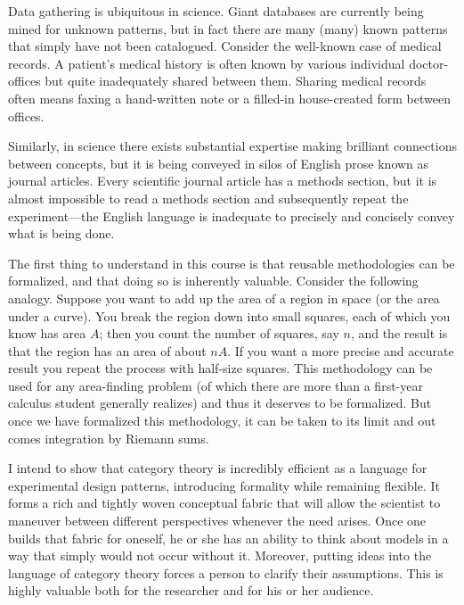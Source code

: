 \documentclass{book}
\theoremstyle{remark}
\theoremstyle{definition}
\begin{document}
Data gathering is ubiquitous in science. Giant databases are currently being mined for unknown patterns, but in fact there are many (many) known patterns that simply have not been catalogued. Consider the well-known case of medical records. A patient's medical history is often known by various individual doctor-offices but quite inadequately shared between them. Sharing medical records often means faxing a hand-written note or a filled-in house-created form between offices. 

Similarly, in science there exists substantial expertise making brilliant connections between concepts, but it is being conveyed in silos of English prose known as journal articles. Every scientific journal article has a methods section, but it is almost impossible to read a methods section and subsequently repeat the experiment---the English language is inadequate to precisely and concisely convey what is being done.

The first thing to understand in this course is that reusable methodologies can be formalized, and that doing so is inherently valuable. Consider the following analogy. Suppose you want to add up the area of a region in space (or the area under a curve). You break the region down into small squares, each of which you know has area $A$; then you count the number of squares, say $n$, and the result is that the region has an area of about $nA$. If you want a more precise and accurate result you repeat the process with half-size squares. This methodology can be used for any area-finding problem (of which there are more than a first-year calculus student generally realizes) and thus it deserves to be formalized. But once we have formalized this methodology, it can be taken to its limit and out comes integration by Riemann sums. 

I intend to show that category theory is incredibly efficient as a language for experimental design patterns, introducing formality while remaining flexible. It forms a rich and tightly woven conceptual fabric that will allow the scientist to maneuver between different perspectives whenever the need arises. Once one builds that fabric for oneself, he or she has an ability to think about models in a way that simply would not occur without it.  Moreover, putting ideas into the language of category theory forces a person to clarify their assumptions. This is highly valuable both for the researcher and for his or her audience.
\end{document}
